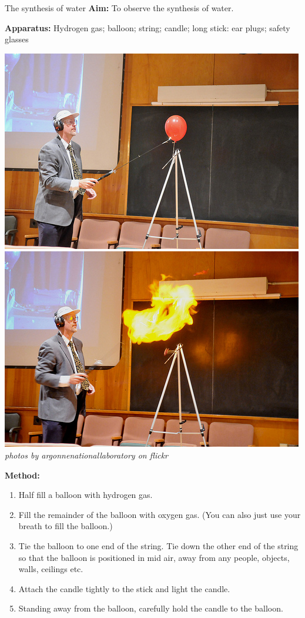             \begin{g_experiment}{The synthesis of water}
            \nopagebreak
            \label{m38709*id63175}\noindent{}\textbf{Aim:}\newline
    To observe the synthesis of water.\par 
        \label{m38709*id63194}\noindent{}\textbf{Apparatus:}\newline
    Hydrogen gas; balloon; string; candle; long stick: ear plugs; safety glasses\par 
      \label{m38709*id63199}
    \setcounter{subfigure}{0}
    \begin{center}
\includegraphics[width=.3\textwidth]{photos/hydrogen_balloon1.jpg} 
\includegraphics[width=.3\textwidth]{photos/hydrogen_balloon2_argonnenationallaboratory.jpg} \\
\textsl{photos by argonnenationallaboratory on flickr}
    \end{center}
        \label{m38709*id63206}\noindent{}\textbf{Method:}\label{m38709*id63212}\begin{enumerate}[noitemsep, label=\textbf{\arabic*}. ] 
\item Half fill a balloon with hydrogen gas.
\item Fill the remainder of the balloon with oxygen gas. (You can also just use your breath to fill the balloon.)
\item Tie the balloon to one end of the string. Tie down the other end of the string so that the balloon is positioned in mid air, away from any people, objects, walls, ceilings etc.
\item Attach the candle tightly to the stick and light the candle.
\item Standing away from the balloon, carefully hold the candle to the balloon.

\end{enumerate}
\end{g_experiment}
